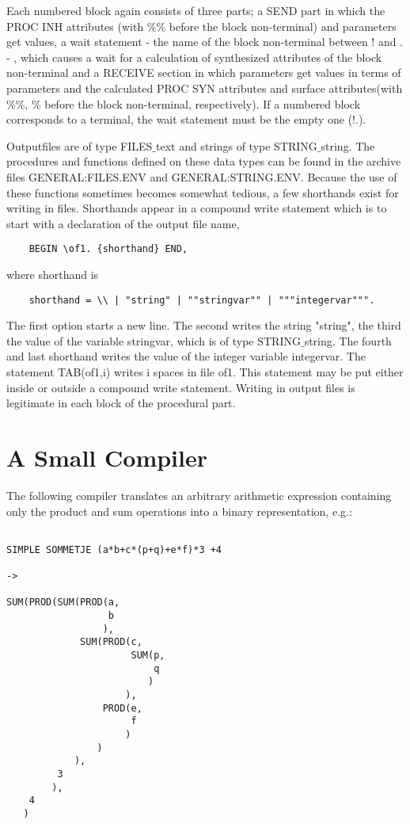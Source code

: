 \begin{itemize}
Each numbered block again consists of three parts; a SEND part in which the
PROC INH attributes (with \%\% before the block non-terminal) and parameters
get values, a wait statement - the name of the block non-terminal
between ! and . - , which causes a wait for a calculation of
synthesized attributes of the block non-terminal and a RECEIVE section in which
parameters get values in terms of parameters and the calculated PROC SYN
attributes and surface attributes(with \%\%, \% before the block non-terminal,
respectively). If a numbered block corresponds to a terminal, the wait
statement must be the empty one (!.).

Outputfiles are of type FILES$\_$text and strings of type STRING$\_$string. The
procedures and functions defined on these data types can be found in the
archive files GENERAL:FILES.ENV and GENERAL:STRING.ENV. Because the use of
these functions sometimes becomes somewhat tedious, a few shorthands exist for
writing in files. Shorthands appear in a compound write statement which is to
start with a declaration of the output file name,
\begin{verbatim}
    BEGIN \of1. {shorthand} END,
\end{verbatim}
where shorthand is
\begin{verbatim}
    shorthand = \\ | "string" | ""stringvar"" | """integervar""".
\end{verbatim}
The first option starts a new line. The second writes the string "string",
the third the value of the variable stringvar, which is of type
STRING$\_$string.
The fourth and last shorthand writes the value of the integer variable
integervar. The statement TAB(of1,i) writes i spaces in file of1. This statement
may be put either inside or outside a compound write statement. Writing in
output files is legitimate in each block of the procedural part.
\end{itemize}
\newpage
\section{A Small Compiler}
The following compiler translates an arbitrary arithmetic expression containing
only the product and sum operations into a binary representation, e.g.:
\begin{verbatim}

SIMPLE SOMMETJE (a*b+c*(p+q)+e*f)*3 +4

->

SUM(PROD(SUM(PROD(a,
                  b
                 ),
             SUM(PROD(c,
                      SUM(p,
                          q
                         )
                     ),
                 PROD(e,
                      f
                     )
                )
            ),
         3
        ),
    4
   )
\end{verbatim}
